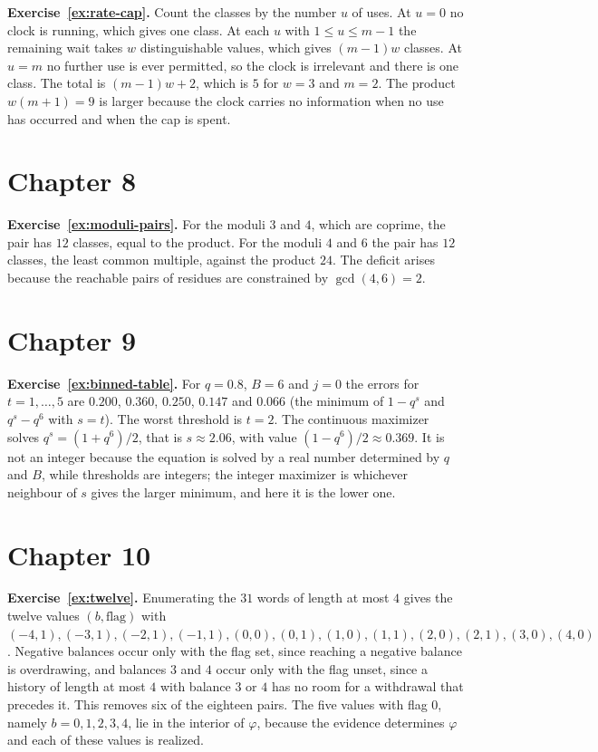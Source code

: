 \textbf{Exercise~\ref{ex:rate-cap}.} Count the classes by the number $u$ of uses. At $u=0$ no clock is running, which gives one class. At each $u$ with $1\le u\le m-1$ the remaining wait takes $w$ distinguishable values, which gives $(m-1)w$ classes. At $u=m$ no further use is ever permitted, so the clock is irrelevant and there is one class. The total is $(m-1)w+2$, which is $5$ for $w=3$ and $m=2$. The product $w(m+1)=9$ is larger because the clock carries no information when no use has occurred and when the cap is spent.

\section*{Chapter 8}

\textbf{Exercise~\ref{ex:moduli-pairs}.} For the moduli $3$ and $4$, which are coprime, the pair has $12$ classes, equal to the product. For the moduli $4$ and $6$ the pair has $12$ classes, the least common multiple, against the product $24$. The deficit arises because the reachable pairs of residues are constrained by $\gcd(4,6)=2$.

\section*{Chapter 9}

\textbf{Exercise~\ref{ex:binned-table}.} For $q=0.8$, $B=6$ and $j=0$ the errors for $t=1,\dots,5$ are $0.200$, $0.360$, $0.250$, $0.147$ and $0.066$ (the minimum of $1-q^{s}$ and $q^{s}-q^{6}$ with $s=t$). The worst threshold is $t=2$. The continuous maximizer solves $q^{s}=(1+q^{6})/2$, that is $s\approx2.06$, with value $(1-q^{6})/2\approx0.369$. It is not an integer because the equation is solved by a real number determined by $q$ and $B$, while thresholds are integers; the integer maximizer is whichever neighbour of $s$ gives the larger minimum, and here it is the lower one.

\section*{Chapter 10}

\textbf{Exercise~\ref{ex:twelve}.} Enumerating the $31$ words of length at most $4$ gives the twelve values $(b,\text{flag})$ with $(-4,1),(-3,1),(-2,1),(-1,1),(0,0),(0,1),(1,0),(1,1),(2,0),(2,1),(3,0),(4,0)$. Negative balances occur only with the flag set, since reaching a negative balance is overdrawing, and balances $3$ and $4$ occur only with the flag unset, since a history of length at most $4$ with balance $3$ or $4$ has no room for a withdrawal that precedes it. This removes six of the eighteen pairs. The five values with flag $0$, namely $b=0,1,2,3,4$, lie in the interior of $\varphi$, because the evidence determines $\varphi$ and each of these values is realized.


